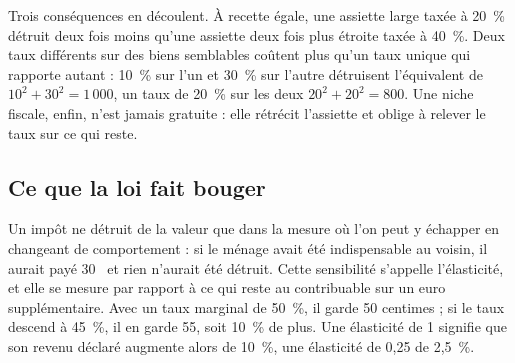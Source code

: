 \documentclass[11pt,a4paper]{article}
\providecommand{\euro}{\texteuro}
\begin{document}
Trois conséquences en découlent. À recette égale, une assiette large taxée à 20~\% détruit deux fois
moins qu'une assiette deux fois plus étroite taxée à 40~\%. Deux taux différents sur des biens
semblables coûtent plus qu'un taux unique qui rapporte autant : 10~\% sur l'un et 30~\% sur l'autre
détruisent l'équivalent de $10^2 + 30^2 = 1\,000$, un taux de 20~\% sur les deux $20^2 + 20^2 = 800$.
Une niche fiscale, enfin, n'est jamais gratuite : elle rétrécit l'assiette et oblige à relever le
taux sur ce qui reste.

\subsection{Ce que la loi fait bouger}

Un impôt ne détruit de la valeur que dans la mesure où l'on peut y échapper en changeant de
comportement : si le ménage avait été indispensable au voisin, il aurait payé 30~\euro{} et rien
n'aurait été détruit. Cette sensibilité s'appelle l'élasticité, et elle se mesure par rapport à ce
qui reste au contribuable sur un euro supplémentaire. Avec un taux marginal de 50~\%, il garde
50 centimes ; si le taux descend à 45~\%, il en garde 55, soit 10~\% de plus. Une élasticité de 1
signifie que son revenu déclaré augmente alors de 10~\%, une élasticité de 0,25 de 2,5~\%.
\end{document}
